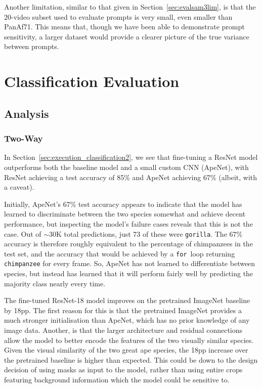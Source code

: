\documentclass[author={Jacob Stephenson},
    degree={BSc},
    title={Robust Great Ape Species Detection in Wild Camera Trap Imagery with Promptable Concept Segmentation},
    unit={COMS30045},
    subtitle={}]{dissertation}
\begin{document}
Another limitation, similar to that given in Section~\ref{sec:evalsam3lim}, is that the 20-video subset used to evaluate prompts is very small, even smaller than PanAf71. This means that, though we have been able to demonstrate prompt sensitivity, a larger dataset would provide a clearer picture of the true variance between prompts.


\section{Classification Evaluation}
\label{sec:evalclass}

\subsection{Analysis}

\subsubsection{Two-Way}

In Section~\ref{sec:execution_classification2}, we see that fine-tuning a ResNet model outperforms both the baseline model and a small custom CNN (ApeNet), with ResNet achieving a test accuracy of 85\% and ApeNet achieving 67\% (albeit, with a caveat).

Initially, ApeNet's 67\% test accuracy appears to indicate that the model has learned to discriminate between the two species somewhat and achieve decent performance, but inspecting the model's failure cases reveals that this is not the case. Out of $\sim30$K total predictions, just 73 of these were \texttt{gorilla}. The 67\% accuracy is therefore roughly equivalent to the percentage of chimpanzees in the test set, and the accuracy that would be achieved by a \texttt{for}~loop returning \texttt{chimpanzee} for every frame. So, ApeNet has not learned to differentiate between species, but instead has learned that it will perform fairly well by predicting the majority class nearly every time.

The fine-tuned ResNet-18 model improves on the pretrained ImageNet baseline by 18pp. The first reason for this is that the pretrained ImageNet provides a much stronger initialisation than ApeNet, which has no prior knowledge of any image data. Another, is that the larger architecture and residual connections allow the model to better encode the features of the two visually similar species. Given the visual similarity of the two great ape species, the 18pp increase over the pretrained baseline is higher than expected. This could be down to the design decision of using masks as input to the model, rather than using entire crops featuring background information which the model could be sensitive to.
\end{document}
